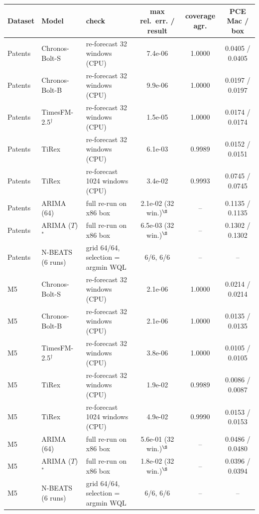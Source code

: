 \begin{tabular}{lllccc}
\toprule
Dataset & Model & check & max rel.\ err. / result & coverage agr. & PCE Mac / box \\
\midrule
Patents & Chronos-Bolt-S & re-forecast 32 windows (CPU) & 7.4e-06 & 1.0000 & 0.0405 / 0.0405 \\
Patents & Chronos-Bolt-B & re-forecast 32 windows (CPU) & 9.9e-06 & 1.0000 & 0.0197 / 0.0197 \\
Patents & TimesFM-2.5$^\dagger$ & re-forecast 32 windows (CPU) & 1.5e-05 & 1.0000 & 0.0174 / 0.0174 \\
Patents & TiRex & re-forecast 32 windows (CPU) & 6.1e-03 & 0.9989 & 0.0152 / 0.0151 \\
Patents & TiRex & re-forecast 1024 windows (CPU) & 3.4e-02 & 0.9993 & 0.0745 / 0.0745 \\
Patents & ARIMA (64) & full re-run on x86 box & 2.1e-02 (32 win.)$^\S$ & -- & 0.1135 / 0.1135 \\
Patents & ARIMA ($T$)$^\ast$ & full re-run on x86 box & 6.5e-03 (32 win.)$^\S$ & -- & 0.1302 / 0.1302 \\
Patents & N-BEATS (6 runs) & grid 64/64, selection = argmin WQL & 6/6, 6/6 & -- & -- \\
\midrule
M5 & Chronos-Bolt-S & re-forecast 32 windows (CPU) & 2.1e-06 & 1.0000 & 0.0214 / 0.0214 \\
M5 & Chronos-Bolt-B & re-forecast 32 windows (CPU) & 2.1e-06 & 1.0000 & 0.0135 / 0.0135 \\
M5 & TimesFM-2.5$^\dagger$ & re-forecast 32 windows (CPU) & 3.8e-06 & 1.0000 & 0.0105 / 0.0105 \\
M5 & TiRex & re-forecast 32 windows (CPU) & 1.9e-02 & 0.9989 & 0.0086 / 0.0087 \\
M5 & TiRex & re-forecast 1024 windows (CPU) & 4.9e-02 & 0.9990 & 0.0153 / 0.0153 \\
M5 & ARIMA (64) & full re-run on x86 box & 5.6e-01 (32 win.)$^\S$ & -- & 0.0486 / 0.0480 \\
M5 & ARIMA ($T$)$^\ast$ & full re-run on x86 box & 1.8e-02 (32 win.)$^\S$ & -- & 0.0396 / 0.0394 \\
M5 & N-BEATS (6 runs) & grid 64/64, selection = argmin WQL & 6/6, 6/6 & -- & -- \\
\bottomrule
\end{tabular}
